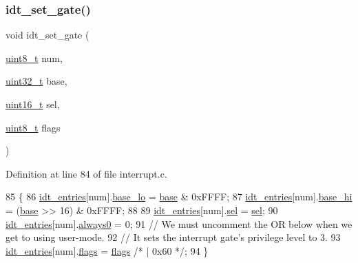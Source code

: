 \subsubsection{\texorpdfstring{idt\+\_\+set\+\_\+gate()}{idt\_set\_gate()}}
{\footnotesize\ttfamily void idt\+\_\+set\+\_\+gate (\begin{DoxyParamCaption}\item[{\hyperlink{a00101_aba7bc1797add20fe3efdf37ced1182c5_aba7bc1797add20fe3efdf37ced1182c5}{uint8\+\_\+t}}]{num,  }\item[{\hyperlink{a00101_a435d1572bf3f880d55459d9805097f62_a435d1572bf3f880d55459d9805097f62}{uint32\+\_\+t}}]{base,  }\item[{\hyperlink{a00101_a273cf69d639a59973b6019625df33e30_a273cf69d639a59973b6019625df33e30}{uint16\+\_\+t}}]{sel,  }\item[{\hyperlink{a00101_aba7bc1797add20fe3efdf37ced1182c5_aba7bc1797add20fe3efdf37ced1182c5}{uint8\+\_\+t}}]{flags }\end{DoxyParamCaption})}



Definition at line 84 of file interrupt.\+c.


\begin{DoxyCode}
85 \{
86     \hyperlink{a00074_a02c62ffc54da283f5faaa40b125d2dce_a02c62ffc54da283f5faaa40b125d2dce}{idt\_entries}[num].\hyperlink{a00154_a4b5fce0881deb4959d33da77d1ed0202_a4b5fce0881deb4959d33da77d1ed0202}{base\_lo} = \hyperlink{a00068_a0523cedff47e2441fc198b7770ec5d3f_a0523cedff47e2441fc198b7770ec5d3f}{base} & 0xFFFF;
87     \hyperlink{a00074_a02c62ffc54da283f5faaa40b125d2dce_a02c62ffc54da283f5faaa40b125d2dce}{idt\_entries}[num].\hyperlink{a00154_af46adb2603d1d8b4a3bedf7f1c6daed4_af46adb2603d1d8b4a3bedf7f1c6daed4}{base\_hi} = (\hyperlink{a00068_a0523cedff47e2441fc198b7770ec5d3f_a0523cedff47e2441fc198b7770ec5d3f}{base} >> 16) & 0xFFFF;
88 
89     \hyperlink{a00074_a02c62ffc54da283f5faaa40b125d2dce_a02c62ffc54da283f5faaa40b125d2dce}{idt\_entries}[num].\hyperlink{a00154_a3c9321c263139e56901a05efee220047_a3c9321c263139e56901a05efee220047}{sel}     = \hyperlink{a00074_af0b0a7e10694e3b600c7561311cc8271_af0b0a7e10694e3b600c7561311cc8271}{sel};
90     \hyperlink{a00074_a02c62ffc54da283f5faaa40b125d2dce_a02c62ffc54da283f5faaa40b125d2dce}{idt\_entries}[num].\hyperlink{a00154_adc747b3ff87142c71b7b8c51e03c067c_adc747b3ff87142c71b7b8c51e03c067c}{always0} = 0;
91     \textcolor{comment}{// We must uncomment the OR below when we get to using user-mode.}
92     \textcolor{comment}{// It sets the interrupt gate's privilege level to 3.}
93     \hyperlink{a00074_a02c62ffc54da283f5faaa40b125d2dce_a02c62ffc54da283f5faaa40b125d2dce}{idt\_entries}[num].\hyperlink{a00154_a02277c77564820972ae5df0a37c80be0_a02277c77564820972ae5df0a37c80be0}{flags}   = \hyperlink{a00074_aa2585d779da0ab21273a8d92de9a0ebe_aa2585d779da0ab21273a8d92de9a0ebe}{flags} \textcolor{comment}{/* | 0x60 */};
94 \}
\end{DoxyCode}
\mbox{\label{a00071_a35fe413107af682030ab7a4b6dff19b8_a35fe413107af682030ab7a4b6dff19b8}} 
